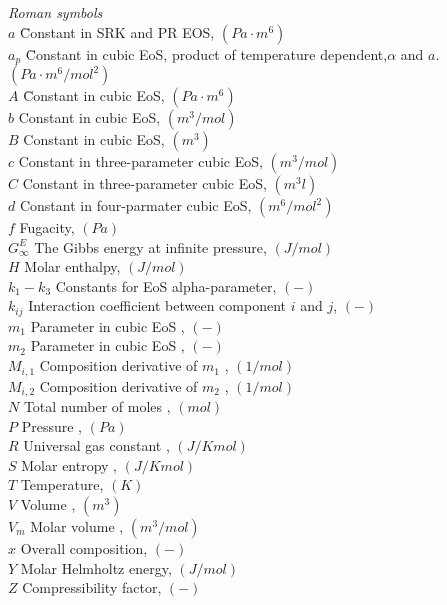 \begin{tabbing}
\textit{Roman symbols}\\
$a$ \hspace{20mm} \=  Constant in SRK and PR EOS, $(Pa\cdot m^6)$\\
$a_p$ \hspace{20mm} \=  Constant in cubic EoS, product of temperature dependent,$\alpha$ and $a$. $(Pa\cdot m^6/mol^2)$\\
$A$ \hspace{20mm} \=  Constant in cubic EoS, $(Pa\cdot m^6)$\\
$b$ \> Constant in cubic EoS, $(m^3/mol)$\\
$B$ \> Constant in cubic EoS, $(m^3)$\\
$c$ \> Constant in three-parameter cubic EoS, $( m^3/mol) $\\
$C$ \> Constant in three-parameter cubic EoS, $( m^3l) $\\
$d$ \> Constant in four-parmater cubic EoS, $(m^6/mol^2) $\\
$f$ \> Fugacity, $(Pa) $\\
$G_{\infty}^E$ \> The Gibbs energy at infinite pressure, $(J/mol) $\\
$H$ \> Molar enthalpy, $(J/mol) $\\
$k_{1}-k_{3}$ \> Constants for EoS alpha-parameter, $(-) $\\
$k_{ij}$ \> Interaction coefficient between component $i$ and $j$, $(-) $\\
$m_1$ \> Parameter in cubic EoS , $(-)$\\
$m_2$ \> Parameter in cubic EoS , $(-)$\\
$M_{i,1}$ \> Composition derivative of $m_1$ , $(1/mol)$\\
$M_{i,2}$ \> Composition derivative of $m_2$ , $(1/mol)$\\
$N$ \>Total number of moles , $(mol)$\\
$P$ \> Pressure , $(Pa)$\\
$R$ \> Universal gas constant , $(J/K mol)$\\
$S$ \> Molar entropy , $(J/K mol)$\\
$T$ \> Temperature, $(K)$\\
$V$ \> Volume , $(m^3)$\\
$V_m$ \> Molar volume , $(m^3/mol)$\\
$x$ \> Overall composition, $(-)$\\
$Y$ \> Molar Helmholtz energy, $(J/mol)$\\
$Z$ \> Compressibility factor, $(-)$\\
\\


\end{tabbing}
